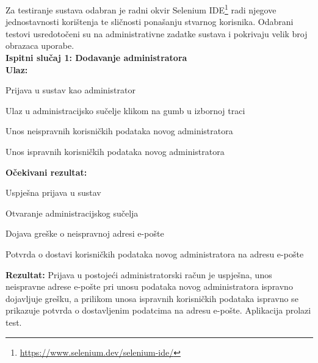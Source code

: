 			Za testiranje sustava odabran je radni okvir Selenium IDE\footnote{\url{https://www.selenium.dev/selenium-ide/}} radi njegove jednostavnosti korištenja te sličnosti ponašanju stvarnog korisnika. Odabrani testovi usredotočeni su na administrativne zadatke sustava i pokrivaju velik broj obrazaca uporabe.\\ 
			
			\noindent  \textbf{Ispitni slučaj 1: Dodavanje administratora}\\
			 \textbf{Ulaz:}
			 \begin{packed_enum}
			 	\item {Prijava u sustav kao administrator}
			 	\item {Ulaz u administracijsko sučelje klikom na gumb u izbornoj traci}
			 	\item {Unos neispravnih korisničkih podataka novog administratora}
			 	\item {Unos ispravnih korisničkih podataka novog administratora}
			 \end{packed_enum}
			 
			 
			 \textbf{Očekivani rezultat:}
			 \begin{packed_enum}
			 	\item {Uspješna prijava u sustav}
			 	\item {Otvaranje administracijskog sučelja}
			 	\item {Dojava greške o neispravnoj adresi e-pošte}
			 	\item {Potvrda o dostavi korisničkih podataka novog administratora na adresu e-pošte}
			 \end{packed_enum}
			 \textbf{Rezultat: }Prijava u postojeći administratorski račun je uspješna, unos neispravne adrese e-pošte pri unosu podataka novog administratora ispravno dojavljuje grešku, a prilikom unosa ispravnih korisničkih podataka ispravno se prikazuje potvrda o dostavljenim podatcima na adresu e-pošte. {\color{green} Aplikacija prolazi test.}
			 
